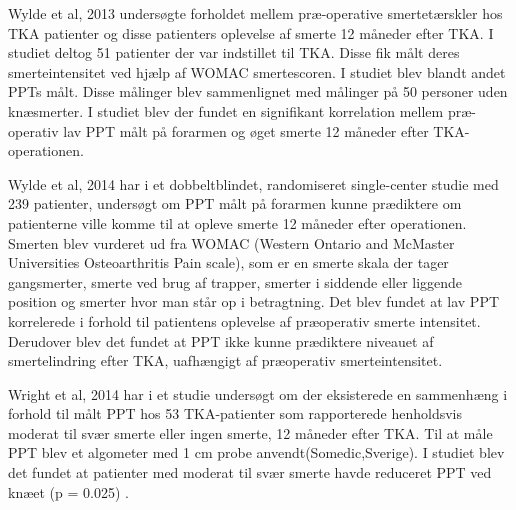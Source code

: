 Wylde et al, 2013 undersøgte forholdet mellem præ-operative smertetærskler hos TKA patienter og disse patienters oplevelse af smerte 12 måneder efter TKA. I studiet deltog 51 patienter der var indstillet til TKA. Disse fik målt deres smerteintensitet ved hjælp af WOMAC smertescoren. I studiet blev blandt andet PPTs  målt. Disse målinger blev sammenlignet med målinger på 50 personer uden knæsmerter. I studiet blev der fundet en signifikant korrelation mellem præ-operativ lav PPT målt på forarmen og øget smerte 12 måneder efter TKA-operationen.


Wylde et al, 2014 har i et dobbeltblindet, randomiseret single-center studie med 239 patienter, undersøgt om PPT målt på forarmen kunne prædiktere om patienterne ville komme til at opleve smerte 12 måneder efter operationen. Smerten blev vurderet ud fra WOMAC (Western Ontario and McMaster Universities Osteoarthritis Pain scale), som er en smerte skala der tager gangsmerter, smerte ved brug af trapper, smerter i siddende eller liggende position og smerter hvor man står op i betragtning. Det  blev fundet at lav PPT korrelerede i forhold til patientens oplevelse af præoperativ smerte intensitet. Derudover blev det fundet at PPT ikke kunne prædiktere niveauet af smertelindring efter TKA, uafhængigt af præoperativ smerteintensitet.

Wright et al, 2014 har i et studie undersøgt om der eksisterede en sammenhæng i forhold til målt PPT hos 53 TKA-patienter som rapporterede henholdsvis moderat til svær smerte eller ingen smerte, 12 måneder efter TKA. Til at måle PPT blev et algometer med 1 cm probe anvendt(Somedic,Sverige). I studiet blev det fundet at patienter med moderat til svær smerte havde reduceret PPT ved knæet (p = 0.025) .



